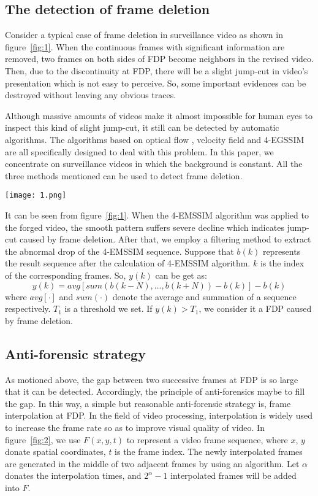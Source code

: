 \documentclass[pdftex,twocolumn,epjc3]{svjour3}          %
\begin{document}
\subsection{The detection of frame deletion}
\label{sec:sub21}
Consider a typical case of frame deletion in surveillance video as shown in figure~\ref{fig:1}. When the continuous frames with significant information are removed, two frames on both sides of FDP become neighbors in the revised video. Then, due to the discontinuity at FDP, there will be a slight jump-cut in video's presentation which is not easy to perceive. So, some important evidences can be destroyed without leaving any obvious traces.

Although massive amounts of videos make it almost impossible for human eyes to inspect this kind of slight jump-cut, it still can be detected by automatic algorithms. The algorithms based on optical flow \cite{A10}, velocity field \cite{A11} and 4-EGSSIM \cite{A12} are all specifically designed to deal with this problem. In this paper, we concentrate on surveillance videos in which the background is constant. All the three methods mentioned can be used to detect frame deletion.
\begin{figure*}[!t]
 \texttt{[image: 1.png]}
 \caption{Schematic diagram for detecting frame deletion.}\label{fig:1}
\end{figure*}
It can be seen from figure~\ref{fig:1}. When the 4-EMSSIM algorithm was applied to the forged video, the smooth pattern suffers severe decline which indicates jump-cut caused by frame deletion. After that, we employ a filtering method to extract the abnormal drop of the 4-EMSSIM sequence. Suppose that $b(k)$ represents the result sequence after the calculation of 4-EMSSIM algorithm. $k$ is the index of the corresponding frames. So, $y(k)$ can be get as:
\begin{equation}
y(k)=avg[sum(b(k-N),...,b(k+N))-b(k)]-b(k)
\end{equation}
where $avg[\cdot]$ and $sum(\cdot)$ denote the average and summation of a sequence respectively. $T_1$ is a threshold we set. If $y(k)>T_1$, we consider it a FDP caused by frame deletion.

\subsection{Anti-forensic strategy}
\label{sec:sub22}
As motioned above, the gap between two successive frames at FDP is so large that it can be detected. Accordingly, the principle of anti-forensics maybe to fill the gap. In this way, a simple but reasonable anti-forensic strategy is, frame interpolation at FDP. In the field of video processing, interpolation is widely used to increase the frame rate so as to improve visual quality of video. In figure~\ref{fig:2}, we use $F(x, y, t)$ to represent a video frame sequence, where $x$, $y$ donate spatial coordinates, $t$ is the frame index. The newly interpolated frames are generated in the middle of two adjacent frames by using an algorithm. Let $\alpha$ donates the interpolation times, and $2^{\alpha}-1$ interpolated frames will be added into $F$.
\end{document}
